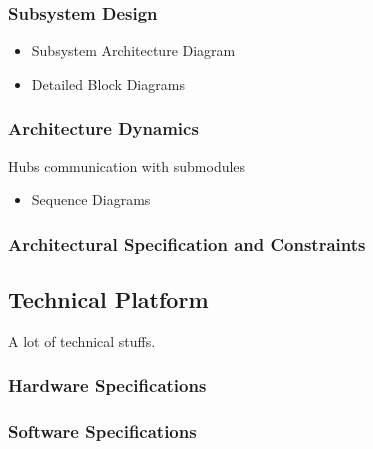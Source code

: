 	\subsubsection{Subsystem Design}
		\begin{itemize}
			\item Subsystem Architecture Diagram
			\item Detailed Block Diagrams
		\end{itemize}
	\subsubsection{Architecture Dynamics}
		Hubs communication with submodules
		\begin{itemize}
			\item Sequence Diagrams
		\end{itemize}
	\subsubsection{Architectural Specification and Constraints}
\subsection{Technical Platform}
	A lot of technical stuffs. 
	\subsubsection{Hardware Specifications}
	\subsubsection{Software Specifications}